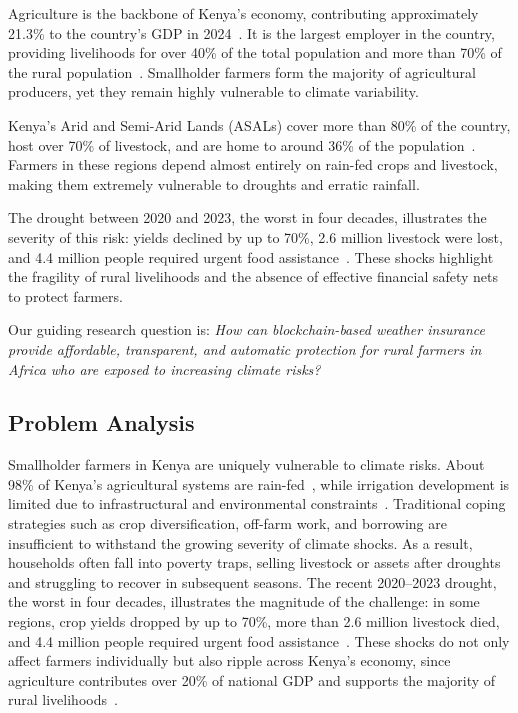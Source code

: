 \documentclass[11pt,a4paper]{article}
\begin{document}
    Agriculture is the backbone of Kenya’s economy, contributing approximately 21.3\% to the country’s GDP in 2024~\parencite{WorldBank2024}.
    It is the largest employer in the country, providing livelihoods for over 40\% of the total population and more than 70\% of the rural population~\parencite{FAO2024}.
    Smallholder farmers form the majority of agricultural producers, yet they remain highly vulnerable to climate variability.

    Kenya’s Arid and Semi-Arid Lands (ASALs) cover more than 80\% of the country, host over 70\% of livestock, and are home to around 36\% of the population~\parencite{IUCN2021,NDMA2021,UNEPDHI2021}.
    Farmers in these regions depend almost entirely on rain-fed crops and livestock, making them extremely vulnerable to droughts and erratic rainfall.

    The drought between 2020 and 2023, the worst in four decades, illustrates the severity of this risk: yields declined by up to 70\%, 2.6 million livestock were lost, and 4.4 million people required urgent food assistance~\parencite{TheStar2024,NDMA2024}.
    These shocks highlight the fragility of rural livelihoods and the absence of effective financial safety nets to protect farmers.

    Our guiding research question is: \emph{How can blockchain-based weather insurance provide affordable, transparent, and automatic protection for rural farmers in Africa who are exposed to increasing climate risks?}

    \subsection{Problem Analysis}\label{subsec:problem-analysis}
    Smallholder farmers in Kenya are uniquely vulnerable to climate risks.
    About 98\% of Kenya’s agricultural systems are rain-fed~\parencite{GoK2017}, while irrigation development is limited due to infrastructural and environmental constraints~\parencite{WairimuND}.
    Traditional coping strategies such as crop diversification, off-farm work, and borrowing are insufficient to withstand the growing severity of climate shocks.
    As a result, households often fall into poverty traps, selling livestock or assets after droughts and struggling to recover in subsequent seasons.
    The recent 2020--2023 drought, the worst in four decades, illustrates the magnitude of the challenge: in some regions, crop yields dropped by up to 70\%, more than 2.6 million livestock died, and 4.4 million people required urgent food assistance~\parencite{OCHA2023,TheStar2024}.
    These shocks do not only affect farmers individually but also ripple across Kenya’s economy, since agriculture contributes over 20\% of national GDP and supports the majority of rural livelihoods~\parencite{WorldBank2024}.
\end{document}
